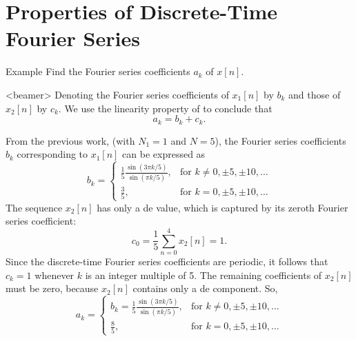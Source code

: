 \section{Properties of Discrete-Time Fourier Series}


\begin{frame}{Example}
    Find the Fourier series coefficients $a_k$ of $x[n]$.
    \begin{figure}
        \centering
        
    \end{figure}
\end{frame}


\begin{frame}<beamer>
        Denoting the Fourier series coefficients of $x_1[n]$ by $b_k$ and those of $x_2[n]$ by $c_k$. We use the linearity property of to conclude that
        \begin{equation*}
            a_k = b_k + c_k.
        \end{equation*}
    \begin{figure}
        \centering
        
    \end{figure}
    \begin{figure}
        \centering
        
    \end{figure}
\end{frame}

\begin{frame}[allowframebreaks]
    {
        From the previous work, (with $N_1 = 1$ and $N = 5$), the Fourier series coefficients $b_k$ corresponding to $x_1[n]$ can be expressed as
        \begin{equation*}
            b_k = \begin{cases}\frac{1}{5}\frac{\sin(3\pi k/5)}{\sin(\pi k/5)}, & \text{for~} k \neq 0, \pm 5, \pm 10, \dots\\\frac{3}{5}, & \text{for~} k = 0, \pm 5, \pm 10, \dots\end{cases}
        \end{equation*}
        \pause
        The sequence $x_2[n]$ has only a de value, which is captured by its zeroth Fourier series coefficient:
        \begin{equation*}
            c_0 = \frac{1}{5}\sum_{n=0}^{4}x_2[n] = 1.
        \end{equation*}
        Since the discrete-time Fourier series coefficients are periodic, it follows that $c_k = 1$ whenever $k$ is an integer multiple of 5. The remaining coefficients of $x_2[n]$ must be zero, because $x_2[n]$ contains only a de component.
        \pause
        So,
        \begin{equation*}
            a_k = \begin{cases}b_k = \frac{1}{5}\frac{\sin(3\pi k/5)}{\sin(\pi k/5)}, & \text{for~} k \neq 0, \pm 5, \pm 10, \dots\\\frac{8}{5}, & \text{for~} k = 0, \pm 5, \pm 10, \dots\end{cases}
        \end{equation*}

    }
\end{frame}

